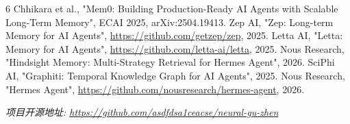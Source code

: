 \documentclass[11pt,a4paper]{article}
\begin{document}
\begin{thebibliography}{6}
 Chhikara et al., "Mem0: Building Production-Ready AI Agents with Scalable Long-Term Memory", ECAI 2025, arXiv:2504.19413.
 Zep AI, "Zep: Long-term Memory for AI Agents", \url{https://github.com/getzep/zep}, 2025.
 Letta AI, "Letta: Memory for AI Agents", \url{https://github.com/letta-ai/letta}, 2025.
 Nous Research, "Hindsight Memory: Multi-Strategy Retrieval for Hermes Agent", 2026.
 SciPhi AI, "Graphiti: Temporal Knowledge Graph for AI Agents", 2025.
 Nous Research, "Hermes Agent", \url{https://github.com/nousresearch/hermes-agent}, 2026.
\end{thebibliography}

\vspace{1em}
\noindent\textit{项目开源地址: \url{https://github.com/asdfdsa1ceacse/neural-gu-zhen}}
\end{document}
